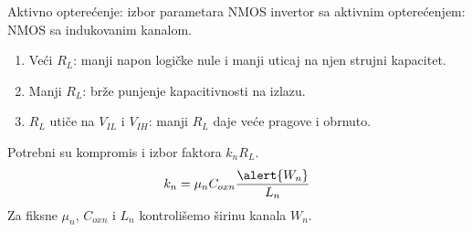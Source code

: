 \begin{frame}[label=09_1-s035]{Aktivno opterećenje: izbor parametara}\setlength{\parskip}{2pt}\setlength{\abovedisplayskip}{4pt}\setlength{\belowdisplayskip}{4pt}\setlength{\abovedisplayshortskip}{3pt}\setlength{\belowdisplayshortskip}{3pt}
\alert{NMOS invertor sa aktivnim opterećenjem: NMOS sa indukovanim kanalom.}\begin{enumerate}
\item Veći $R_L$: manji napon logičke nule i manji uticaj na njen strujni kapacitet.
\item Manji $R_L$: brže punjenje kapacitivnosti na izlazu.
\item $R_L$ utiče na $V_{IL}$ i $V_{IH}$: manji $R_L$ daje veće pragove i obrnuto.
\end{enumerate}
Potrebni su kompromis i izbor faktora $k_nR_L$.
\[k_n=\mu_nC_{oxn}\frac{\alert{W_n}}{L_n}\]
Za fiksne $\mu_n$, $C_{oxn}$ i $L_n$ kontrolišemo \alert{širinu kanala $W_n$}.
\end{frame}
